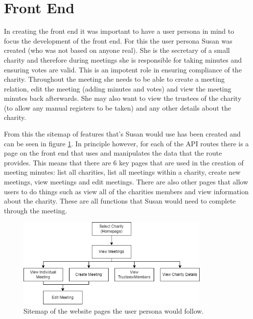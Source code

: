 \documentclass{UoYCSproject}
\begin{document}
\section{Front End}
\label{sec:front_end}
In creating the front end it was important to have a user persona in mind to focus the development of the front end. For this the user persona Susan was created (who was not based on anyone real). She is the secretary of a small charity and therefore during meetings she is responsible for taking minutes and ensuring votes are valid. This is an impotent role in ensuring compliance of the charity. Throughout the meeting she needs to be able to create a meeting relation, edit the meeting (adding minutes and votes) and view the meeting minutes back afterwards. She may also want to view the trustees of the charity (to allow any manual registers to be taken) and any other details about the charity.

From this the sitemap of features that's Susan would use has been created and can be seen in figure \ref{fig:sitemap}. In principle however, for each of the API routes there is a page on the front end that uses and manipulates the data that the route provides. This means that there are 6 key pages that are used in the creation of meeting minutes: list all charities, list all meetings within a charity, create new meetings, view meetings and edit meetings. There are also other pages that allow users to do things such as view all of the charities members and view information about the charity. These are all functions that Susan would need to complete through the meeting.


\begin{figure}[htb]
\begin{center}
\includegraphics[width=0.85\textwidth]{"./assets/implementation-assets/Site Map v2.drawio.png"}
\end{center}
\caption{Sitemap of the website pages the user persona would follow.}
\label{fig:sitemap}
\end{figure}
\end{document}
